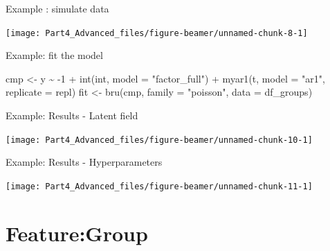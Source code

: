 \documentclass[
  ignorenonframetext,
]{beamer}
\newenvironment{Shaded}{\begin{snugshade}}{\end{snugshade}}
\newcommand{\AttributeTok}[1]{\textcolor[rgb]{0.77,0.63,0.00}{#1}}
\newcommand{\DecValTok}[1]{\textcolor[rgb]{0.00,0.00,0.81}{#1}}
\newcommand{\FunctionTok}[1]{\textcolor[rgb]{0.00,0.00,0.00}{#1}}
\newcommand{\NormalTok}[1]{#1}
\newcommand{\OtherTok}[1]{\textcolor[rgb]{0.56,0.35,0.01}{#1}}
\newcommand{\SpecialCharTok}[1]{\textcolor[rgb]{0.00,0.00,0.00}{#1}}
\newcommand{\StringTok}[1]{\textcolor[rgb]{0.31,0.60,0.02}{#1}}
\begin{document}
\begin{frame}{Example : simulate data}
\protect\hypertarget{example-simulate-data-1}{}
\begin{center}\texttt{[image: Part4\_Advanced\_files/figure-beamer/unnamed-chunk-8-1]} \end{center}
\normalsize
\end{frame}

\begin{frame}[fragile]{Example: fit the model}
\protect\hypertarget{example-fit-the-model}{}
\begin{Shaded}
\begin{Highlighting}[]
\NormalTok{cmp }\OtherTok{\textless{}{-}}\NormalTok{ y }\SpecialCharTok{\textasciitilde{}}  \SpecialCharTok{{-}}\DecValTok{1} \SpecialCharTok{+} \FunctionTok{int}\NormalTok{(int,  }\AttributeTok{model =} \StringTok{"factor\_full"}\NormalTok{) }\SpecialCharTok{+}
  \FunctionTok{myar1}\NormalTok{(t, }\AttributeTok{model =} \StringTok{"ar1"}\NormalTok{, }\AttributeTok{replicate =}\NormalTok{ repl)}
\NormalTok{fit }\OtherTok{\textless{}{-}} \FunctionTok{bru}\NormalTok{(cmp, }\AttributeTok{family =} \StringTok{"poisson"}\NormalTok{, }\AttributeTok{data =}\NormalTok{ df\_groups)}
\end{Highlighting}
\end{Shaded}
\end{frame}

\begin{frame}{Example: Results - Latent field}
\protect\hypertarget{example-results---latent-field}{}
\begin{center}\texttt{[image: Part4\_Advanced\_files/figure-beamer/unnamed-chunk-10-1]} \end{center}
\end{frame}

\begin{frame}{Example: Results - Hyperparameters}
\protect\hypertarget{example-results---hyperparameters}{}
\begin{center}\texttt{[image: Part4\_Advanced\_files/figure-beamer/unnamed-chunk-11-1]} \end{center}
\end{frame}

\hypertarget{featuregroup}{%
\section{Feature:Group}\label{featuregroup}}
\end{document}
